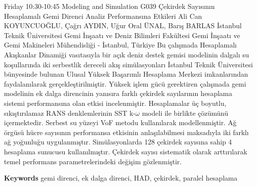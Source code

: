 
    \begin{abstract_basarim}
    {Friday 10:30-10:45}
    {Modeling and Simulation}
    {G039}
    {Çekirdek Sayısının Hesaplamalı Gemi Direnci Analiz Performansına Etkileri}
    {%
    Ali Can KOYUNCUOĞLU, Çağrı AYDIN, Uğur Oral ÜNAL, Barış BARLAS}
    {%
    }
    {%
    İstanbul Teknik Üniversitesi Gemi İnşaatı ve Deniz Bilimleri Fakültesi Gemi İnşaatı ve Gemi Makineleri Mühendisliği - İstanbul, Türkiye}
    Bu çalışmada Hesaplamalı Akışkanlar Dinamiği vasıtasıyla bir açık deniz destek gemisi modelinin dalgalı su koşullarında iki serbestlik dereceli akış simülasyonları İstanbul Teknik Üniversitesi bünyesinde bulunan Ulusal Yüksek Başarımlı Hesaplama Merkezi imkanlarından faydalanılarak gerçekleştirilmiştir. Yüksek işlem gücü gerektiren çalışmada gemi modelinin ek dalga direncinin yanısıra farklı çekirdek sayılarının hesaplama sistemi performansına olan etkisi incelenmiştir. Hesaplamalar üç boyutlu, sıkıştırılamaz RANS denklemlerinin SST k-$\omega$ modeli ile birlikte çözümünü içermektedir. Serbest su yüzeyi VoF metodu kullanılarak modellenmiştir. Ağ örgüsü hücre sayısının performansa etkisinin anlaşılabilmesi maksadıyla iki farklı ağ yoğunluğu uygulanmıştır. Simülasyonlarda 128 çekirdek sayısına sahip 4 hesaplama sunucusu kullanılmıştır. Çekirdek sayısı sistematik olarak arttırılarak temel performans parametrelerindeki değişim gözlenmiştir. 
    
        \textbf{Keywords} \newline{}gemi direnci, ek dalga direnci, HAD, çekirdek, paralel hesaplama
    \end{abstract_basarim}
    